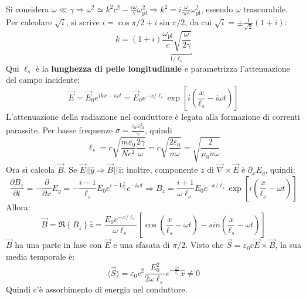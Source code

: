 \documentclass[10pt, a4paper]{scrartcl}
\numberwithin{equation}{subsection}
\theoremstyle{style1}
\begin{document}
Si considera $\omega \ll \gamma\Rightarrow \omega ^2 \simeq k^2 c^2 - \frac{i\omega}{\gamma}\omega_\text{pl}^2	\Rightarrow k^2 = i \frac{\omega}{\gamma c^2}\omega_\text{pl}^2$, essendo $\omega$ trascurabile. Per calcolare $\sqrt{i} $, si scrive $i = \cos \pi / 2 + i \sin \pi / 2$, da cui $\sqrt{ i } = \pm \frac{1}{\sqrt{2} }(1+i)$:
\begin{equation}
	k = (1+i) \underbracket{\frac{\omega_\text{pl}}{c} \sqrt{\frac{\omega}{2 \gamma}} }_{1 / \ell _s} 
\end{equation}
Qui $\ell _s$ \`e la \textbf{lunghezza di pelle longitudinale} e parametrizza l'attenuazione del campo incidente:
\begin{equation}
\vec{E}= \vec{E}_0 e^{ ikx - i\omega t} = \vec{E}_0 e^{-x / \ell _s} \exp \left[ i \left(\frac{x}{\ell _s} - i\omega t\right)  \right]
\end{equation}
L'attenuazione della radiazione nel conduttore \`e legata alla formazione di correnti parassite. Per basse frequenze $\sigma = \frac{\varepsilon _0 \omega_\text{pl}^2}{\gamma}$, quindi
\begin{equation}
	\ell _s =c \sqrt{\frac{m\varepsilon _0}{Ne^2} \frac{2\gamma}{\omega}}  =c \sqrt{\frac{2\varepsilon _0}{\sigma \omega}} = \sqrt{\frac{2}{\mu_0 \sigma \omega}}  
\end{equation}
Ora si calcola $\vec{B}$. Se $\vec{E}| | \hat{y}\Rightarrow \vec{B} | | \hat{z}$; inoltre, componente $z$ di $\vec{\nabla }\times \vec{E}$ \`e $\partial _x E_y$, quindi:
\[
\frac{\partial B_z}{\partial t} = - \frac{\partial }{\partial x} E_y = - \frac{i-1}{\ell _s} E_0 e^{i-1 \frac{x}{\ell _s}} e^{-i\omega t}  \Rightarrow B_z = \frac{i+1}{\omega \ell _s} E_0 e^{ - x / \ell _s} \exp \left[ i \left(\frac{x}{\ell _s}-\omega t\right)  \right]  
\] 
Allora:
\begin{equation}
	\vec{B}=\Re \left\{ B_z \right\} \hat{z}= \frac{E_0 e^{- x / \ell _s} }{\omega \ell _s} \left[ \cos \left(\frac{x}{\ell _s}-\omega t\right) - sin \left(\frac{x}{\ell _s}-\omega t\right)  \right] 
\end{equation}
$\vec{B}$ ha una parte in fase con $\vec{E}$ e una sfasata di $\pi / 2$. Visto che $\vec{S}=\varepsilon _0 c \vec{E}\times \vec{B}$, la sua media temporale \`e:
\begin{equation}
	\langle \vec{S} \rangle= \varepsilon _0 c^2 \frac{E_0^2}{2\omega \ell _s} e^{- \frac{2x}{\ell _s}} \hat{ x}\neq 0
\end{equation}
Quindi c'\`e assorbimento di energia nel conduttore.
\end{document}
